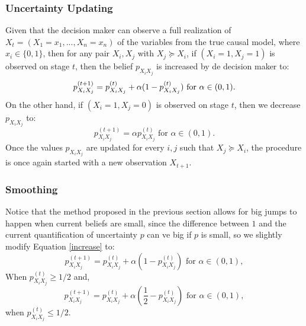 \documentclass[letterpaper]{article}
\begin{document}
\subsubsection{Uncertainty Updating}
Given that the decision maker can observe a full realization of $X_t=(X_1=x_1,...,X_n=x_n)$ of the variables from the true causal model, where $x_i \in \{0,1 \}$, then for any pair $X_i,X_j$ with $X_j \succeq X_i$, if $(X_i=1, X_j=1)$ is observed on stage $t$, then the belief $p_{X_i X_j}$ is increased by de decision maker to:
\begin{equation}{\label{increase}}
 p_{X_i X_j}^{(t+1)} = p_{X_i X_j}^{(t)}+\alpha (1-p_{X_i X_j}^{(t)}) \textrm{ for } \alpha \in (0,1). 
 \end{equation}
On the other hand, if $(X_i=1, X_j=0)$ is observed on stage $t$, then we decrease $p_{X_i X_j}$ to:
\begin{equation}
p_{X_i X_j}^{(t+1)} =   \alpha p_{X_i X_j}^{(t)}  \textrm{ for } \alpha \in (0,1).  \end{equation}
Once the values  $p_{X_i X_j}$ are updated for every $i,j$ such that $X_j \succeq X_i$, the procedure is once again started with a new observation $X_{t+1}$.

\subsubsection{Smoothing}
Notice that the method proposed in the previous section allows for big jumps to happen when current beliefs are small, since the difference between $1$ and the current quantification of uncertainty $p$ can ve big if $p$ is small, so we slightly modify Equation \ref{increase} to:
\begin{equation}
 p_{X_i X_j}^{(t+1)} = p_{X_i X_j}^{(t)}+\alpha (1-p_{X_i X_j}^{(t)}) \textrm{ for } \alpha \in (0,1),
\end{equation}
When $p_{X_i X_j}^{(t)} \geq 1/2$ and,
\begin{equation}
 p_{X_i X_j}^{(t+1)} = p_{X_i X_j}^{(t)}+\alpha (\frac{1}{2}-p_{X_i X_j}^{(t)}) \textrm{ for } \alpha \in (0,1),
\end{equation}
when $p_{X_i X_j}^{(t)} \leq 1/2$. 
\end{document}
